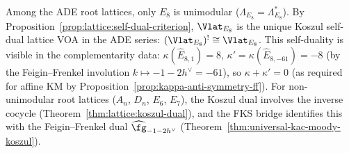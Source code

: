 \begin{remark}[Unimodularity and self-duality at $k = 1$]%
\label{rem:level1-unimodular}%
Among the ADE root lattices, only $E_8$ is unimodular
($\Lambda_{E_8} = \Lambda_{E_8}^*$). By
Proposition~\ref{prop:lattice:self-dual-criterion},
$\Vlat_{E_8}$ is the unique Koszul self-dual lattice VOA
in the ADE series:
$(\Vlat_{E_8})^! \cong \Vlat_{E_8}$. This self-duality
is visible in the complementarity data:
$\kappa(\widehat{E}_{8,1}) = 8$,
$\kappa' = \kappa(\widehat{E}_{8,-61}) = -8$
(by the Feigin--Frenkel involution $k \mapsto -1-2h^\vee = -61$),
so $\kappa + \kappa' = 0$ (as required for affine KM by
Proposition~\ref{prop:kappa-anti-symmetry-ff}).
For non-unimodular root lattices ($A_n$, $D_n$, $E_6$, $E_7$),
the Koszul dual involves the inverse cocycle
(Theorem~\ref{thm:lattice:koszul-dual}), and the FKS
bridge identifies this with the Feigin--Frenkel dual
$\widehat{\fg}_{-1-2h^\vee}$
(Theorem~\ref{thm:universal-kac-moody-koszul}).
\end{remark}
